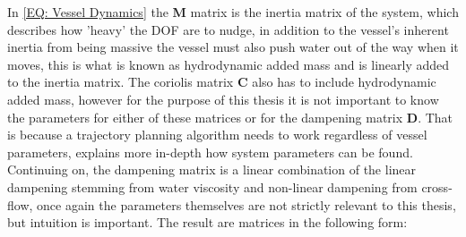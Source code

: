 

In \eqref{EQ: Vessel Dynamics} the \textbf{M} matrix is the inertia matrix of the system, which describes how 'heavy' the \gls{DOF} are to nudge, in
addition to the vessel's inherent inertia from being massive the vessel must also push water out of the way when it moves, this is what is known as
hydrodynamic added mass and is linearly added to the inertia matrix. The coriolis matrix \textbf{C} also has to include hydrodynamic added mass,
however for the purpose of this thesis it is not important to know the parameters for either of these matrices or for the dampening matrix \textbf{D}.
That is because a trajectory planning algorithm needs to work regardless of vessel parameters, \cite{pedersen2019optimization} explains more in-depth
how system parameters can be found. Continuing on, the dampening matrix is a linear combination of the linear dampening stemming from water
viscosity and non-linear dampening from cross-flow, once again the parameters themselves are not strictly relevant to this thesis, but intuition is
important. The result are matrices in the following form:

